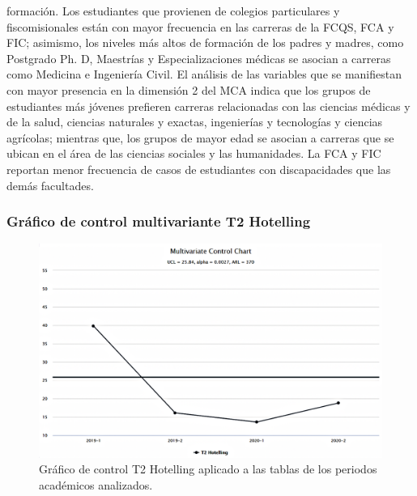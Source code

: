 \documentclass[water,article,submit,moreauthors,pdftex]{mdpi}
\begin{document}
formación. Los estudiantes que provienen de colegios particulares y
fiscomisionales están con mayor frecuencia en las carreras de la FCQS,
FCA y FIC; asimismo, los niveles más altos de formación de los padres y
madres, como Postgrado Ph. D, Maestrías y Especializaciones médicas se
asocian a carreras como Medicina e Ingeniería Civil. El análisis de las
variables que se manifiestan con mayor presencia en la dimensión 2 del
MCA indica que los grupos de estudiantes más jóvenes prefieren carreras
relacionadas con las ciencias médicas y de la salud, ciencias naturales
y exactas, ingenierías y tecnologías y ciencias agrícolas; mientras que,
los grupos de mayor edad se asocian a carreras que se ubican en el área
de las ciencias sociales y las humanidades. La FCA y FIC reportan menor
frecuencia de casos de estudiantes con discapacidades que las demás
facultades.

\hypertarget{gruxe1fico-de-control-multivariante-t2-hotelling}{%
\subsubsection{Gráfico de control multivariante T2
Hotelling}\label{gruxe1fico-de-control-multivariante-t2-hotelling}}

\begin{figure}[!ht]



\begin{center}\includegraphics[width=0.9\linewidth,]{t2edu} \end{center}

\caption{Gráfico de control T2 Hotelling aplicado a las tablas de los periodos académicos analizados.}

\label{fig:t2edu}
\end{figure}
\end{document}
